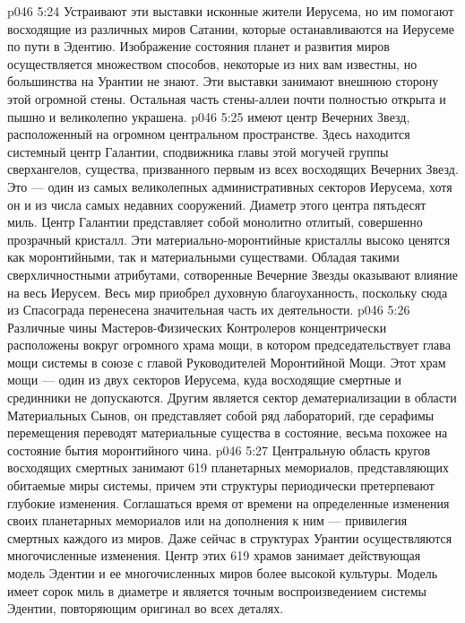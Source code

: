 \vs p046 5:24 Устраивают эти выставки исконные жители Иерусема, но им помогают восходящие из различных миров Сатании, которые останавливаются на Иерусеме по пути в Эдентию. Изображение состояния планет и развития миров осуществляется множеством способов, некоторые из них вам известны, но большинства на Урантии не знают. Эти выставки занимают внешнюю сторону этой огромной стены. Остальная часть стены\hyp{}аллеи почти полностью открыта и пышно и великолепно украшена.
\vs p046 5:25 \pc {}\bibnobreakspace {} имеют центр Вечерних Звезд, расположенный на огромном центральном пространстве. Здесь находится системный центр Галантии, сподвижника главы этой могучей группы сверхангелов, существа, призванного первым из всех восходящих Вечерних Звезд. Это --- один из самых великолепных административных секторов Иерусема, хотя он и из числа самых недавних сооружений. Диаметр этого центра пятьдесят миль. Центр Галантии представляет собой монолитно отлитый, совершенно прозрачный кристалл. Эти материально\hyp{}моронтийные кристаллы высоко ценятся как моронтийными, так и материальными существами. Обладая такими сверхличностными атрибутами, сотворенные Вечерние Звезды оказывают влияние на весь Иерусем. Весь мир приобрел духовную благоуханность, поскольку сюда из Спасограда перенесена значительная часть их деятельности.
\vs p046 5:26 \pc {}\bibnobreakspace {} Различные чины Мастеров\hyp{}Физических Контролеров концентрически расположены вокруг огромного храма мощи, в котором председательствует глава мощи системы в союзе с главой Руководителей Моронтийной Мощи. Этот храм мощи --- один из двух секторов Иерусема, куда восходящие смертные и срединники не допускаются. Другим является сектор дематериализации в области Материальных Сынов, он представляет собой ряд лабораторий, где серафимы перемещения переводят материальные существа в состояние, весьма похожее на состояние бытия моронтийного чина.
\vs p046 5:27 \pc {}\bibnobreakspace {} Центральную область кругов восходящих смертных занимают 619 планетарных мемориалов, представляющих обитаемые миры системы, причем эти структуры периодически претерпевают глубокие изменения. Соглашаться время от времени на определенные изменения своих планетарных мемориалов или на дополнения к ним --- привилегия смертных каждого из миров. Даже сейчас в структурах Урантии осуществляются многочисленные изменения. Центр этих 619 храмов занимает действующая модель Эдентии и ее многочисленных миров более высокой культуры. Модель имеет сорок миль в диаметре и является точным воспроизведением системы Эдентии, повторяющим оригинал во всех деталях.
